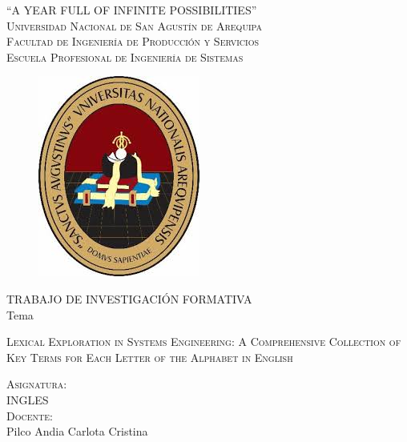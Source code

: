 \documentclass[oneside,letterpaper]{article}            %
\newcommand{\itemYear}{A YEAR FULL OF INFINITE POSSIBILITIES}
\newcommand{\itemRType}{TRABAJO DE INVESTIGACIÓN FORMATIVA}
\newcommand{\itemCourseG}{INGLES}
\newcommand{\itemTheme}{Lexical Exploration in Systems Engineering: A Comprehensive Collection of Key Terms for Each Letter of the Alphabet in English}
\newcommand{\itemTeacher}{Pilco Andia Carlota Cristina}
\begin{document}
\begin{titlepage}
    \centering
    \begin{spacing}{1.7}
        \Large{``\itemYear''}\\ %
        \Large {\textsc{Universidad Nacional de San Agustín de Arequipa}}\\ 
        \large{\textsc{Facultad de Ingeniería de Producción  y Servicios}\\
        \textsc{Escuela Profesional de Ingeniería de Sistemas}}
        \normalsize
    \end{spacing}
    
    \vspace{0.5cm}
    
    \begin{figure}[h!]
        \begin{center}
            \includegraphics[scale=0.67]{images/IN.jpg} 
        \end{center}
    \end{figure}
    
    \itemRType\\ %
    \vspace{0.35cm}
    Tema\\
    \vspace{0.5cm}
    \begin{spacing}{1}
        \Large{\textsc{\itemTheme}}
    \end{spacing}
    \vspace{0.5cm}
    \textsc{Asignatura:}\\\vspace{0.35cm}
    \itemCourseG
    \\\vspace{0.5cm}
    \textsc{Docente:}\\\vspace{0.35cm}
    \itemTeacher
    

\end{titlepage}
\end{document}
